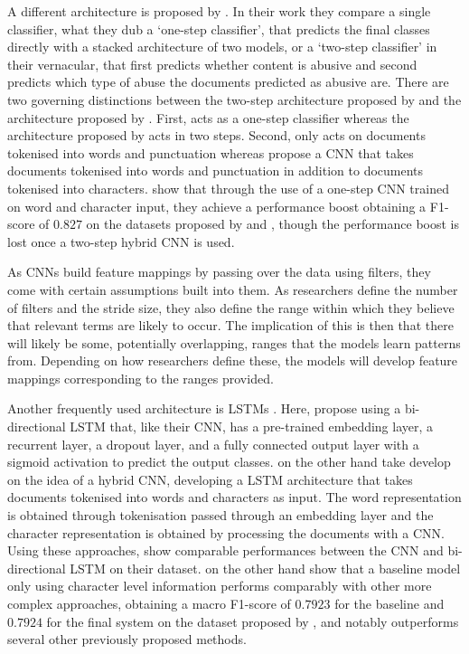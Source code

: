 A different architecture is proposed by \citet{Park:2017}. In their work they compare a single classifier, what they dub a `one-step classifier', that predicts the final classes directly with a stacked architecture of two models, or a `two-step classifier' in their vernacular, that first predicts whether content is abusive and second predicts which type of abuse the documents predicted as abusive are. There are two governing distinctions between the two-step architecture proposed by \citet{Park:2017} and the architecture proposed by \citet{Kolhatkar:2021}. First, \citet{Kolhatkar:2021} acts as a one-step classifier whereas the architecture proposed by \citet{Park:2017} acts in two steps. Second, \citet{Kolhatkar:2021} only acts on documents tokenised into words and punctuation whereas \citet{Park:2017} propose a CNN that takes documents tokenised into words and punctuation in addition to documents tokenised into characters. \citet{Park:2017} show that through the use of a one-step CNN trained on word and character input, they achieve a performance boost obtaining a F1-score of $0.827$ on the datasets proposed by \citet{Waseem-Hovy:2016} and \citet{Waseem:2016}, though the performance boost is lost once a two-step hybrid CNN is used.

As CNNs build feature mappings by passing over the data using filters, they come with certain assumptions built into them. As researchers define the number of filters and the stride size, they also define the range within which they believe that relevant terms are likely to occur. The implication of this is then that there will likely be some, potentially overlapping, ranges that the models learn patterns from. Depending on how researchers define these, the models will develop feature mappings corresponding to the ranges provided.

Another frequently used architecture is LSTMs \citep{Badjatiya:2017,Kolhatkar:2021,Meyer:2019}. Here, \citet{Kolhatkar:2021} propose using a bi-directional LSTM that, like their CNN, has a pre-trained embedding layer, a recurrent layer, a dropout layer, and a fully connected output layer with a sigmoid activation to predict the output classes. \citet{Meyer:2019} on the other hand take develop on the idea of a hybrid CNN, developing a LSTM architecture that takes documents tokenised into words and characters as input. The word representation is obtained through tokenisation passed through an embedding layer and the character representation is obtained by processing the documents with a CNN.
Using these approaches, \citet{Kolhatkar:2021} show comparable performances between the CNN and bi-directional LSTM on their dataset. \citet{Meyer:2019} on the other hand show that a baseline model only using character level information performs comparably with other more complex approaches, obtaining a macro F1-score of $0.7923$ for the baseline and $0.7924$ for the final system on the dataset proposed by \citet{Waseem-Hovy:2016}, and notably outperforms several other previously proposed methods.

